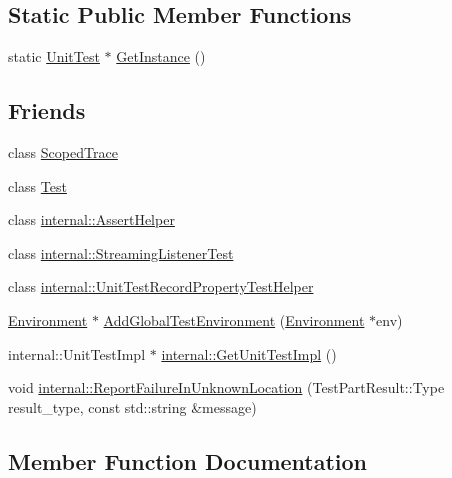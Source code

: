 \subsection*{Static Public Member Functions}
\begin{DoxyCompactItemize}
\item 
static \mbox{\hyperlink{classtesting_1_1UnitTest}{Unit\+Test}} $\ast$ \mbox{\hyperlink{classtesting_1_1UnitTest_a24192400b70b3b946746954e9574fb8e}{Get\+Instance}} ()
\end{DoxyCompactItemize}
\subsection*{Friends}
\begin{DoxyCompactItemize}
\item 
class \mbox{\hyperlink{classtesting_1_1UnitTest_ada54bdd5bdc24f39b9ca16807326654a}{Scoped\+Trace}}
\item 
class \mbox{\hyperlink{classtesting_1_1UnitTest_a5b78b1c2e1fa07ffed92da365593eaa4}{Test}}
\item 
class \mbox{\hyperlink{classtesting_1_1UnitTest_a183151aa061362c87572e743fe233db1}{internal\+::\+Assert\+Helper}}
\item 
class \mbox{\hyperlink{classtesting_1_1UnitTest_adc037d188dab349a94868991955c9cd4}{internal\+::\+Streaming\+Listener\+Test}}
\item 
class \mbox{\hyperlink{classtesting_1_1UnitTest_ae970f89a9f477a349fe5778be85ef42e}{internal\+::\+Unit\+Test\+Record\+Property\+Test\+Helper}}
\item 
\mbox{\hyperlink{classtesting_1_1Environment}{Environment}} $\ast$ \mbox{\hyperlink{classtesting_1_1UnitTest_a5ec26e4c31220ff8e769cc09689a4d6d}{Add\+Global\+Test\+Environment}} (\mbox{\hyperlink{classtesting_1_1Environment}{Environment}} $\ast$env)
\item 
internal\+::\+Unit\+Test\+Impl $\ast$ \mbox{\hyperlink{classtesting_1_1UnitTest_a56e56be7066957d612e53b5c60f6ac08}{internal\+::\+Get\+Unit\+Test\+Impl}} ()
\item 
void \mbox{\hyperlink{classtesting_1_1UnitTest_a73f5a158c13793b90c80d854c9a75120}{internal\+::\+Report\+Failure\+In\+Unknown\+Location}} (Test\+Part\+Result\+::\+Type result\+\_\+type, const std\+::string \&message)
\end{DoxyCompactItemize}


\subsection{Member Function Documentation}
\mbox{\label{classtesting_1_1UnitTest_aa59dde4c3dc43a920ed142a27670686c}} 
